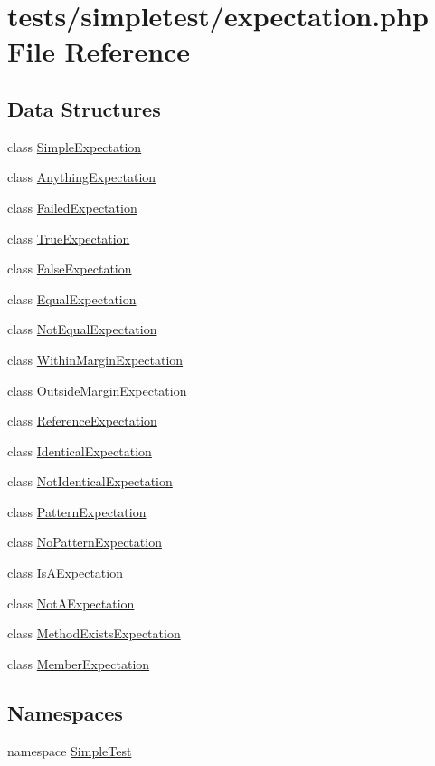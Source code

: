 \hypertarget{expectation_8php}{\section{tests/simpletest/expectation.php File Reference}
\label{expectation_8php}
}
\subsection*{Data Structures}
\begin{DoxyCompactItemize}
\item 
class \hyperlink{class_simple_expectation}{Simple\-Expectation}
\item 
class \hyperlink{class_anything_expectation}{Anything\-Expectation}
\item 
class \hyperlink{class_failed_expectation}{Failed\-Expectation}
\item 
class \hyperlink{class_true_expectation}{True\-Expectation}
\item 
class \hyperlink{class_false_expectation}{False\-Expectation}
\item 
class \hyperlink{class_equal_expectation}{Equal\-Expectation}
\item 
class \hyperlink{class_not_equal_expectation}{Not\-Equal\-Expectation}
\item 
class \hyperlink{class_within_margin_expectation}{Within\-Margin\-Expectation}
\item 
class \hyperlink{class_outside_margin_expectation}{Outside\-Margin\-Expectation}
\item 
class \hyperlink{class_reference_expectation}{Reference\-Expectation}
\item 
class \hyperlink{class_identical_expectation}{Identical\-Expectation}
\item 
class \hyperlink{class_not_identical_expectation}{Not\-Identical\-Expectation}
\item 
class \hyperlink{class_pattern_expectation}{Pattern\-Expectation}
\item 
class \hyperlink{class_no_pattern_expectation}{No\-Pattern\-Expectation}
\item 
class \hyperlink{class_is_a_expectation}{Is\-A\-Expectation}
\item 
class \hyperlink{class_not_a_expectation}{Not\-A\-Expectation}
\item 
class \hyperlink{class_method_exists_expectation}{Method\-Exists\-Expectation}
\item 
class \hyperlink{class_member_expectation}{Member\-Expectation}
\end{DoxyCompactItemize}
\subsection*{Namespaces}
\begin{DoxyCompactItemize}
\item 
namespace \hyperlink{namespace_simple_test}{Simple\-Test}
\end{DoxyCompactItemize}
